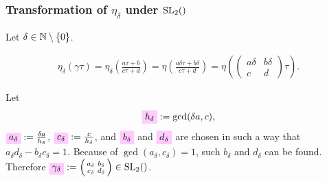 \documentclass{article}
\begin{document}


\begin{Hemmecke}
















\subsubsection{Transformation of $\eta_\delta$ under $\SL2Z$}
\label{sec:eta_delta-transformation}
Let $\delta \in \mathbb{N}\setminus\left\{0\right\}$.

\begin{gather*}
\eta_\delta(\gamma\tau)
=
\eta_\delta\left(\frac{a\tau+b}{c\tau+d}\right) =
\eta\left(\frac{a\delta\tau+b\delta}{c\tau+d}\right)
=
\eta\left(\begin{pmatrix}a\delta&b\delta\\c&d\end{pmatrix}
  \tau\right).
\end{gather*}

Let
%
\begin{gather}
  \defineNotation[h-delta]{h_\delta}
  :=
  \gcd(\delta a,c), \label{eq:h_delta}
\end{gather}
%
$\defineNotation[a-delta]{a_\delta}:=\frac{\delta a}{h_\delta}$,
%
$\defineNotation[c-delta]{c_\delta}:=\frac{c}{h_\delta}$,
%
and $\defineNotation[b-delta]{b_\delta}$ and
$\defineNotation[d-delta]{d_\delta}$ are chosen in such a way that
$a_\delta d_\delta - b_\delta c_\delta = 1$.
%
Because of $\gcd(a_\delta, c_\delta)=1$, such $b_\delta$ and $d_\delta$
can be found.
%
Therefore
  $\defineNotation[gamma-delta]{\gamma_\delta} := \left(
  \begin{smallmatrix}a_\delta&b_\delta\\c_\delta&d_\delta\end{smallmatrix}
\right)\in \SL2Z$.


\end{Hemmecke}
\end{document}
